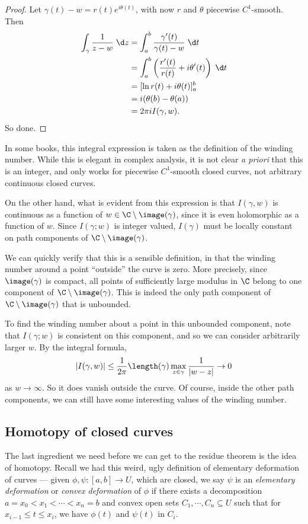 \documentclass[a4paper]{article}
\begin{document}
\begin{proof}
  Let $\gamma(t) - w = r(t) e^{i \theta(t)}$, with now $r$ and $\theta$ piecewise $C^1$-smooth. Then
  \begin{align*}
    \int_\gamma \frac{1}{z - w}\;\d z &= \int_a^b \frac{\gamma'(t)}{\gamma(t) - w}\;\d t\\
    &= \int_a^b \left(\frac{r'(t)}{r(t)} + i \theta'(t)\right) \;\d t\\
    &= [\ln r(t) + i\theta(t)]^b_a\\
    &= i(\theta(b) - \theta(a))\\
    &= 2\pi i I(\gamma, w).
  \end{align*}
  So done.
\end{proof}

In some books, this integral expression is taken as the definition of the winding number. While this is elegant in complex analysis, it is not clear \emph{a priori} that this is an integer, and only works for piecewise $C^1$-smooth closed curves, not arbitrary continuous closed curves.

On the other hand, what is evident from this expression is that $I(\gamma, w)$ is continuous as a function of $w \in \C \setminus \image(\gamma)$, since it is even holomorphic as a function of $w$. Since $I(\gamma; w)$ is integer valued, $I(\gamma)$ must be locally constant on path components of $\C \setminus \image(\gamma)$.

We can quickly verify that this is a sensible definition, in that the winding number around a point ``outside'' the curve is zero. More precisely, since $\image(\gamma)$ is compact, all points of sufficiently large modulus in $\C$ belong to one component of $\C \setminus \image(\gamma)$. This is indeed the only path component of $\C\setminus \image(\gamma)$ that is unbounded.

To find the winding number about a point in this unbounded component, note that $I(\gamma; w)$ is consistent on this component, and so we can consider arbitrarily larger $w$. By the integral formula,
\[
  |I(\gamma, w)| \leq \frac{1}{2\pi} \length(\gamma) \max_{z \in \gamma} \frac{1}{|w - z|} \to 0
\]
as $w \to \infty$. So it does vanish outside the curve. Of course, inside the other path components, we can still have some interesting values of the winding number.

\subsection{Homotopy of closed curves}
The last ingredient we need before we can get to the residue theorem is the idea of homotopy. Recall we had this weird, ugly definition of elementary deformation of curves --- given $\phi, \psi: [a, b] \to U$, which are closed, we say $\psi$ is an \emph{elementary deformation} or \emph{convex deformation} of $\phi$ if there exists a decomposition $a = x_0 < x_1 < \cdots < x_n = b$ and convex open sets $C_1, \cdots, C_n \subseteq U$ such that for $x_{i - 1} \leq t \leq x_i$, we have $\phi(t)$ and $\psi(t)$ in $C_i$.
\end{document}
